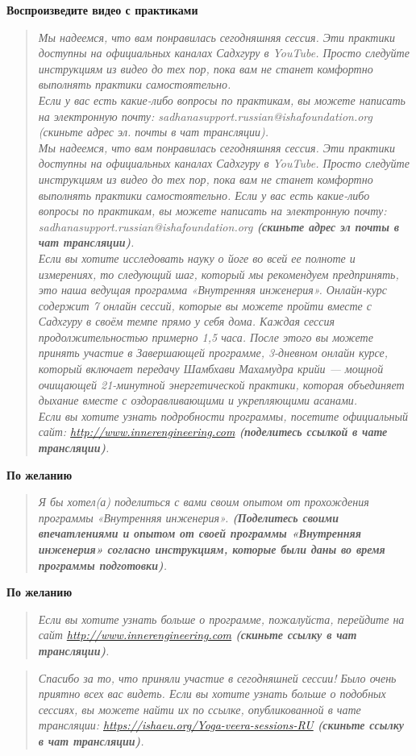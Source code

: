 \textbf{Воспроизведите видео с практиками}
\begin{quote}\emph{
Мы надеемся, что вам понравилась сегодняшняя сессия. Эти практики
доступны на официальных каналах Садхгуру в YouTube. Просто следуйте
инструкциям из видео до тех пор, пока вам не станет комфортно выполнять
практики самостоятельно.
\\
Если у вас есть какие-либо вопросы по практикам, вы можете написать на
электронную почту: sadhanasupport.russian@ishafoundation.org (скиньте
адрес эл. почты в чат трансляции).
\\
Мы надеемся, что вам понравилась сегодняшняя сессия. Эти практики
доступны на официальных каналах Садхгуру в YouTube. Просто следуйте
инструкциям из видео до тех пор, пока вам не станет комфортно выполнять
практики самостоятельно.
Если у вас есть какие-либо вопросы по практикам, вы можете написать на
электронную почту: sadhanasupport.russian@ishafoundation.org \textbf{(скиньте адрес эл почты в чат трансляции)}.
\\
Если вы хотите исследовать науку о йоге во всей ее полноте и измерениях,
то следующий шаг, который мы рекомендуем предпринять, это наша
ведущая программа «Внутренняя инженерия». Онлайн-курс содержит 7
онлайн сессий, которые вы можете пройти вместе с Садхгуру в своём
темпе прямо у себя дома. Каждая сессия продолжительностью примерно
1,5 часа. После этого вы можете принять участие в Завершающей
программе, 3-дневном онлайн курсе, который включает передачу
Шамбхави Махамудра крийи — мощной очищающей 21-минутной
энергетической практики, которая объединяет дыхание вместе с
оздоравливающими и укрепляющими асанами.
\\
Если вы хотите узнать подробности программы, посетите официальный
сайт: \href{http://www.innerengineering.com}{\small http://www.innerengineering.com} \textbf{(поделитесь ссылкой в чате трансляции)}.
}\end{quote}

\textbf{По желанию}
\begin{quote}\emph{
Я бы хотел(а) поделиться с вами своим опытом от прохождения программы «Внутренняя инженерия».
\textbf{(Поделитесь своими впечатлениями и опытом от своей программы
«Внутренняя инженерия» согласно инструкциям, которые были даны во
время программы подготовки)}.
}\end{quote}

\textbf{По желанию}
\begin{quote}\emph{
Если вы хотите узнать больше о программе, пожалуйста, перейдите на сайт \href{http://www.innerengineering.com}{\small http://www.innerengineering.com} \textbf{(скиньте ссылку в чат трансляции)}. 
}\end{quote}

\begin{quote}\emph{
Спасибо за то, что приняли участие в сегодняшней сессии! Было очень приятно всех вас видеть. Если вы хотите узнать больше о подобных сессиях, вы можете найти их по ссылке, опубликованной в чате трансляции: \href{https://ishaeu.org/Yoga-veera-sessions-RU}{\small https://ishaeu.org/Yoga-veera-sessions-RU} \textbf{(скиньте ссылку в чат трансляции)}. 
}\end{quote}
